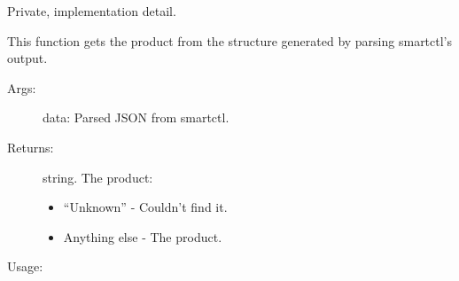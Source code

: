 \documentclass[letterpaper,10pt,english]{sphinxmanual}
\begin{document}
\begin{fulllineitems}
\label{\detokenize{cygwin:getdevinfo.cygwin.get_product}}
Private, implementation detail.

This function gets the product from the structure generated
by parsing smartctl’s output.
\begin{description}
\item[{Args:}] \leavevmode
data:   Parsed JSON from smartctl.

\item[{Returns:}] \leavevmode
string. The product:
\begin{itemize}
\item {} 
“Unknown”     - Couldn’t find it.

\item {} 
Anything else - The product.

\end{itemize}

\end{description}

Usage:

\begin{sphinxVerbatim}[commandchars=\\\{\}]
  
\end{sphinxVerbatim}

\end{fulllineitems}

\end{document}
